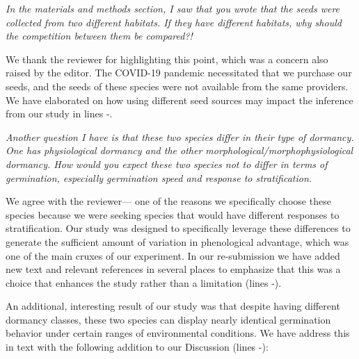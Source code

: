 \documentclass[11pt]{article}
\begin{document}
\emph{In the materials and methods section, I saw that you wrote that the seeds were collected from two different habitats. If they have different habitats, why should the competition between them be compared?!}

We thank the reviewer for highlighting this point, which was a concern also raised by the editor. The COVID-19 pandemic necessitated that we purchase our seeds, and the seeds of these species were not available from the same providers. We have elaborated on how using different seed sources may impact the inference from our study in lines -.

\emph{Another question I have is that these two species differ in their type of dormancy. One has physiological dormancy and the other morphological/morphophysiological dormancy. How would you expect these two species not to differ in terms of germination, especially germination speed and response to stratification.}

We agree with the reviewer--- one of the reasons we specifically choose these species because we were seeking species that would have different responses to stratification. 
Our study was designed to specifically leverage these differences to generate the sufficient amount of variation in phenological advantage, which was one of the main cruxes of our experiment. In our re-submission we have added new text and relevant references in several places to emphasize that this was a choice that enhances the study rather than a limitation (lines -).

An additional, interesting result of our study was that despite having different dormancy classes, these two species can display nearly identical germination behavior under certain ranges of environmental conditions. We have address this in text with the following addition to our Discussion (lines -):



\end{document}
